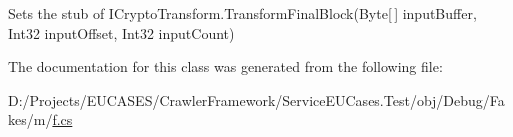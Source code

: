 Sets the stub of I\-Crypto\-Transform.\-Transform\-Final\-Block(\-Byte\mbox{[}$\,$\mbox{]} input\-Buffer, Int32 input\-Offset, Int32 input\-Count)



The documentation for this class was generated from the following file\-:\begin{DoxyCompactItemize}
\item 
D\-:/\-Projects/\-E\-U\-C\-A\-S\-E\-S/\-Crawler\-Framework/\-Service\-E\-U\-Cases.\-Test/obj/\-Debug/\-Fakes/m/\hyperlink{m_2f_8cs}{f.\-cs}\end{DoxyCompactItemize}
